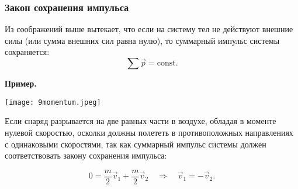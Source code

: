 \documentclass[12pt, a4paper]{article}%
\begin{document}
\subsubsection*{Закон сохранения импульса}
Из соображений выше вытекает, что если на систему тел не действуют внешние силы (или сумма внешних сил равна нулю), то суммарный импульс системы сохраняется:
\[
\sum \vec p = \text{const}.
\]

\textbf{Пример.}

\begin{center}
\texttt{[image: 9momentum.jpeg]}
\label{fig:mpr}
\end{center}

Если снаряд разрывается на две равных части в воздухе, обладая в моменте нулевой скоростью, осколки должны полететь в противоположных направлениях с одинаковыми скоростями, так как суммарный импульс системы должен соответствовать закону сохранения импульса:

\[
0 = \frac{m}{2}\vec v_1 + \frac{m}{2}\vec v_2 \quad\Rightarrow\quad \vec v_1 = -\vec v_2.
\]
\end{document}
